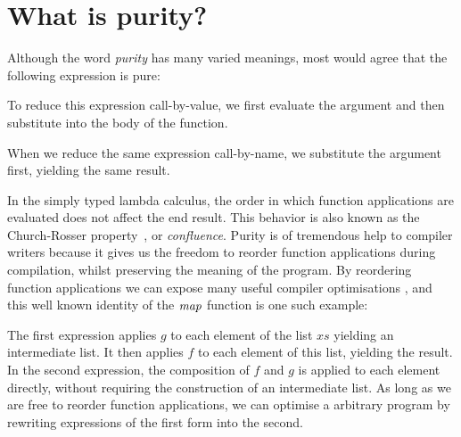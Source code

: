 \clearpage{}
\section{What is purity?}
\label{intro:purity}

Although the word \emph{purity} has many varied meanings, most would agree that the following expression is pure:


To reduce this expression call-by-value, we first evaluate the argument and then substitute into the body of the function.

 
When we reduce the same expression call-by-name, we substitute the argument first, yielding the same result.


In the simply typed lambda calculus, the order in which function applications are evaluated does not affect the end result. This behavior is also known as the Church-Rosser property~\cite{rosser:highlights}, or \emph{confluence}. Purity is of tremendous help to compiler writers because it gives us the freedom to reorder function applications during compilation, whilst preserving the meaning of the program. By reordering function applications we can expose many useful compiler optimisations \cite{santos:compilation}, and this well known identity of the $\operatorname{\mathit{map}}$ function is one such example:


The first expression applies $g$ to each element of the list $xs$ yielding an intermediate list. It then applies $f$ to each element of this list, yielding the result. In the second expression, the composition of $f$ and $g$ is applied to each element directly, without requiring the construction of an intermediate list. As long as we are free to reorder function applications, we can optimise a arbitrary program by rewriting expressions of the first form into the second.

